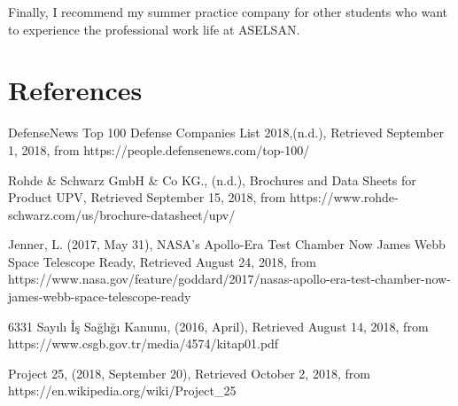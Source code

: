 	Finally, I recommend my summer practice company for other students who want to experience the professional work life at ASELSAN. 

\newpage


\section{References}

\begingroup
\renewcommand{\section}[2]{}%
\begin{thebibliography}{}

	
 DefenseNews Top 100 Defense Companies List 2018,(n.d.), 
Retrieved September 1, 2018, from https://people.defensenews.com/top-100/
	



 Rohde \& Schwarz GmbH \& Co KG., (n.d.), Brochures and Data Sheets for Product UPV, Retrieved September 15, 2018, from https://www.rohde-schwarz.com/us/brochure-datasheet/upv/

 Jenner, L. (2017, May 31), NASA's Apollo-Era Test Chamber Now James Webb Space Telescope Ready, 
Retrieved August 24, 2018, from https://www.nasa.gov/feature/goddard/2017/nasas-apollo-era-test-chamber-now-james-webb-space-telescope-ready

 6331 Sayılı İş Sağlığı Kanunu, (2016, April),
Retrieved August 14, 2018, from https://www.csgb.gov.tr/media/4574/kitap01.pdf

 Project 25, (2018, September 20),
Retrieved October 2, 2018, from https://en.wikipedia.org/wiki/Project\_25


\end{thebibliography}
